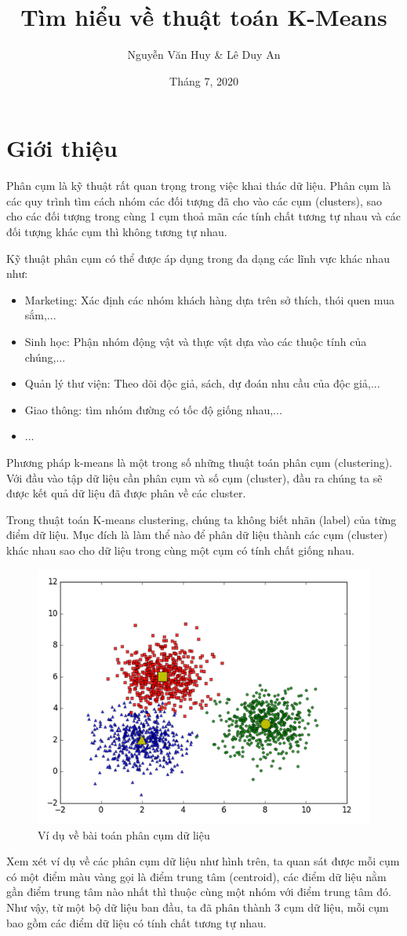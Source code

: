 \documentclass{article}
\title{Tìm hiểu về thuật toán K-Means}
\author{Nguyễn Văn Huy \& Lê Duy An}
\date{Tháng 7, 2020}
\begin{document}
	\maketitle{} 
	\newpage
	\tableofcontents
	\newpage
	\section{Giới thiệu}
	Phân cụm là kỹ thuật rất quan trọng trong việc khai thác dữ liệu. Phân cụm là các quy trình tìm cách nhóm các đối tượng đã cho vào các cụm (clusters), sao cho các đối tượng trong cùng 1 cụm thoả mãn các tính chất tương tự nhau và các đối tượng khác cụm thì không tương tự nhau.\par
	\smallskip
	Kỹ thuật phân cụm có thể được áp dụng trong đa dạng các lĩnh vực khác nhau như:
	\begin{itemize}
		\item Marketing: Xác định các nhóm khách hàng dựa trên sở thích, thói quen mua sắm,...
		\item Sinh học: Phận nhóm động vật và thực vật dựa vào các thuộc tính của chúng,...
		\item Quản lý thư viện: Theo dõi độc giả, sách, dự đoán nhu cầu của độc giả,...
		\item Giao thông: tìm nhóm đường có tốc độ giống nhau,...
		\item ...
	\end{itemize}
	Phương pháp k-means là một trong số những thuật toán phân cụm (clustering). Với đầu vào tập dữ liệu cần phân cụm và số cụm (cluster), đầu ra chúng ta sẽ được kết quả dữ liệu đã được phân về các cluster.\par
	\smallskip
	Trong thuật toán K-means clustering, chúng ta không biết nhãn (label) của từng điểm dữ liệu. Mục đích là làm thể nào để phân dữ liệu thành các cụm (cluster) khác nhau sao cho dữ liệu trong cùng một cụm có tính chất giống nhau.\par
	\smallskip
	\begin{figure}[h]
		\centering
		\includegraphics[width=0.7\linewidth]{img/cluster_ex}
		\caption{Ví dụ về bài toán phân cụm dữ liệu}
	\end{figure}\par
	Xem xét ví dụ về các phân cụm dữ liệu như hình trên, ta quan sát được mỗi cụm có một điểm màu vàng gọi là điểm trung tâm (centroid), các điểm dữ liệu nằm gần điểm trung tâm nào nhất thì thuộc cùng một nhóm với điểm trung tâm đó. Như vậy, từ một bộ dữ liệu ban đầu, ta đã phân thành 3 cụm dữ liệu, mỗi cụm bao gồm các điểm dữ liệu có tính chất tương tự nhau.
	\newpage
\end{document}
